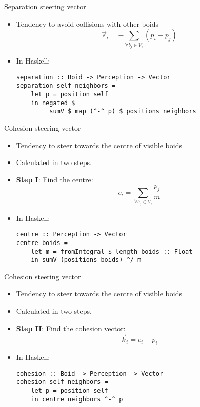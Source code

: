 \documentclass{beamer}
\begin{document}
\begin{frame}[fragile]
    \huge{Separation steering vector}\normalsize
    \begin{itemize}

    \item Tendency to avoid collisions with other boids
        \begin{equation*}
    \vec{s}_i = - \sum\limits_{\forall b_j \in V_i} (p_i - p_j)
    \end{equation*}
    \item<2-> In Haskell:
    \begin{verbatim}
separation :: Boid -> Perception -> Vector
separation self neighbors =
    let p = position self
    in negated $
         sumV $ map (^-^ p) $ positions neighbors
\end{verbatim}
    \end{itemize}


\end{frame}

\begin{frame}[fragile]
\huge{Cohesion steering vector}\normalsize
    \begin{itemize}
        \item Tendency to steer towards the centre of visible boids
        \item Calculated in two steps.
        \item<2-> \textbf{Step I}: Find the centre:
            \begin{equation*}
            c_i = \sum\limits_{\forall b_j \in V_i} \frac{p_j}{m}
            \end{equation*}
        \item<3> In Haskell:
        \begin{verbatim}
centre :: Perception -> Vector
centre boids =
    let m = fromIntegral $ length boids :: Float
    in sumV (positions boids) ^/ m
        \end{verbatim}
    \end{itemize}

\end{frame}

\begin{frame}[fragile]
\huge{Cohesion steering vector}\normalsize
    \begin{itemize}
        \item Tendency to steer towards the centre of visible boids
        \item Calculated in two steps.
\item<1-> \textbf{Step II}: Find the cohesion vector:
            \begin{equation*}
            \vec{k}_i = c_i - p_i
            \end{equation*}
        \item<2> In Haskell:
        \begin{verbatim}
cohesion :: Boid -> Perception -> Vector
cohesion self neighbors =
    let p = position self
    in centre neighbors ^-^ p
        \end{verbatim}
    \end{itemize}
\end{frame}
\end{document}
